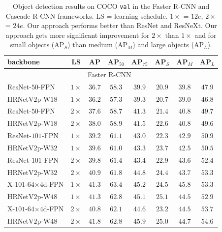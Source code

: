 \documentclass[10pt,journal,compsoc]{IEEEtran}
\begin{document}
\renewcommand{\arraystretch}{1.1}
	\begin{table}[t]
	\setlength{\tabcolsep}{4.4pt}
	\scriptsize
	\centering
	\caption{Object detection results on COCO \texttt{val}
	in the Faster R-CNN and Cascade R-CNN frameworks.
	LS = learning schedule.
	{$1\times$ = $12e$,
	$2\times$ = $24e$.
	Our approach performs better than
	ResNet and ResNeXt.
	Our approach gets more significant improvement
	for $2\times$ than $1\times$
	and for small objects (AP$_S$)
	than medium (AP$_M$) and large objects
	(AP$_L$).}}
	\label{tab:object_detection_fpn}
	\vspace{-.3cm}
	\begin{tabular}{l|c|ccc|ccc}
		\hline %
		backbone & LS & AP & AP$_{50}$ & AP$_{75}$ & AP$_S$ & AP$_M$ & AP$_L$\\
		\hline
		\multicolumn{8}{c}{Faster R-CNN~\cite{LinDGHHB17}}\\
        \hline
	  	ResNet-$50$-FPN  & $1\times$  & $36.7$ & $58.3$ & $39.9$ & $20.9$ & $39.8$ & $47.9$ \\
		HRNetV$2$p-W$18$ & $1\times$ & $36.2$ & $57.3$ & $39.3$ & $20.7$ & $39.0$ & $46.8$ \\
	    ResNet-$50$-FPN & $2\times$  & $37.6$ & $58.7$ & $41.3$ & $21.4$ & ${40.8}$ & ${49.7}$ \\
		HRNetV$2$p-W$18$ & $2\times$ & ${38.0}$ & ${58.9}$ & ${41.5}$ & ${22.6}$ & ${40.8}$ & $49.6$ \\
	    \hline
	    ResNet-$101$-FPN & $1\times$ & $39.2$ & $61.1$ & $43.0$ & $22.3$ & $42.9$ & $50.9$ \\
		HRNetV$2$p-W$32$ & $1\times$ & $39.6$ & $61.0$ & $43.3$ & $23.7$ & $42.5$ & $50.5$ \\
		ResNet-$101$-FPN & $2\times$ & $39.8$ & $61.4$ & $43.4$ & $22.9$ & $43.6$ & $52.4$ \\
	    HRNetV$2$p-W$32$ & $2\times$ & ${40.9}$ & ${61.8}$ & ${44.8}$ & ${24.4}$ & ${43.7}$ & ${53.3}$  \\
	    \hline
	    
	    X-$101$-$64$$\times$$4$d-FPN & $1\times$ & $41.3$ & ${63.4}$ & $45.2$ & $24.5$ & ${45.8}$ & $53.3$ \\
	    HRNetV$2$p-W$48$ & $1\times$ & $41.3$ & $62.8$ & $45.1$ & ${25.1}$ & $44.5$ & $52.9$  \\
	    X-$101$-$64$$\times$$4$d-FPN & $2\times$ & $40.8$ & $62.1$ & $44.6$ & $23.2$ & $44.5$ & $53.7$ \\
	    HRNetV$2$p-W$48$ & $2\times$ & ${41.8}$ & $62.8$ & ${45.9}$ & $25.0$ & $44.7$ & ${54.6}$  \\


\end{tabular}
\end{table}
\end{document}
